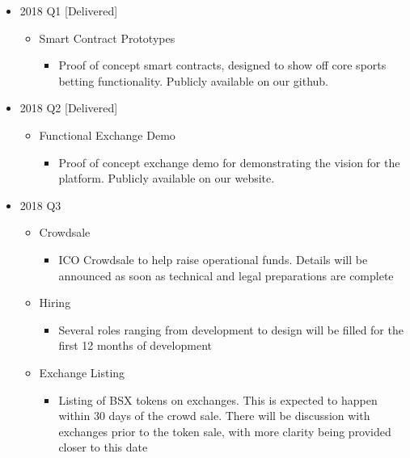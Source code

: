 \documentclass{article}
\begin{document}
\begin{itemize}

   \item 2018 Q1 [Delivered]
   \begin{itemize}
     \item Smart Contract Prototypes
     	\begin{itemize}
     		\item Proof of concept smart contracts, designed to show off core sports betting functionality. Publicly available on our github.
     	\end{itemize}
   \end{itemize}

   \item 2018 Q2 [Delivered]
   \begin{itemize}
     \item Functional Exchange Demo
     	\begin{itemize}
     		\item Proof of concept exchange demo for demonstrating the vision for the platform. Publicly available on our website.
     	\end{itemize}
   \end{itemize}

   \item 2018 Q3
   \begin{itemize}
     \item Crowdsale
     	\begin{itemize}
     		\item ICO Crowdsale to help raise operational funds. Details will be announced as soon as technical and legal preparations are complete
     	\end{itemize}
     \item Hiring
     	\begin{itemize}
     		\item Several roles ranging from development to design will be filled for the first 12 months of development
     	\end{itemize}
      \item Exchange Listing
     	\begin{itemize}
     		\item Listing of BSX tokens on exchanges. This is expected to happen within 30 days of the crowd sale. There will be discussion with exchanges prior to the token sale, with more clarity being provided closer to this date
     	\end{itemize}
   \end{itemize}


\end{itemize}
\end{document}
